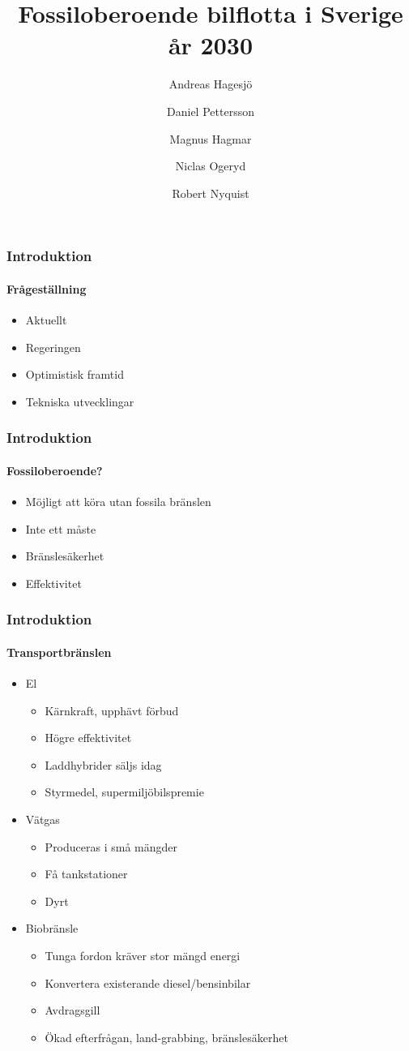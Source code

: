 \documentclass{beamer}
\title{Fossiloberoende bilflotta i Sverige år 2030}
\author[Andreas \and Daniel \and Magnus \and Niclas \and Robert]{Andreas Hagesjö \and Daniel Pettersson \and
Magnus Hagmar \and Niclas Ogeryd \and Robert Nyquist}
\begin{document}
\frame{\titlepage}

\begin{frame}
	\frametitle{Introduktion}
	\framesubtitle{Frågeställning}
	\begin{itemize}
		\item Aktuellt
		\item Regeringen
		\item Optimistisk framtid
		\item Tekniska utvecklingar
	\end{itemize}
\end{frame}

\begin{frame}
	\frametitle{Introduktion}
	\framesubtitle{Fossiloberoende?}
	\begin{itemize}
		\item Möjligt att köra utan fossila bränslen
		\item Inte ett måste
		\item Bränslesäkerhet
		\item Effektivitet
	\end{itemize}
\end{frame}

\begin{frame}
	\frametitle{Introduktion}
	\framesubtitle{Transportbränslen}
	\begin{itemize}
		\item El
			\begin{itemize}
				\item Kärnkraft, upphävt förbud
				\item Högre effektivitet
				\item Laddhybrider säljs idag
				\item Styrmedel, supermiljöbilspremie
			\end{itemize}
		\item Vätgas
			\begin{itemize}
				\item Produceras i små mängder
				\item Få tankstationer
				\item Dyrt
			\end{itemize}
		\item Biobränsle
			\begin{itemize}
				\item Tunga fordon kräver stor mängd energi
				\item Konvertera existerande diesel/bensinbilar
				\item Avdragsgill
				\item Ökad efterfrågan, land-grabbing, bränslesäkerhet
			\end{itemize}
	\end{itemize}
\end{frame}
\end{document}
